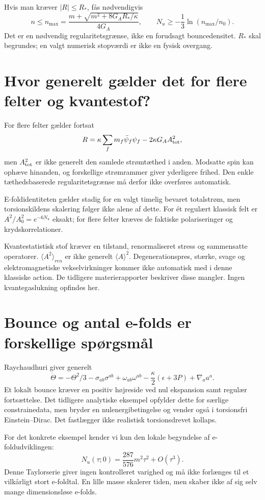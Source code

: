 \documentclass[11pt,a4paper]{article}
\begin{document}
Hvis man kræver $|R|\leq R_*$, fås nødvendigvis
\[
 n\leq n_{\max}=\frac{m+\sqrt{m^2+8G_A R_*/\kappa}}{4G_A},\qquad
 N_u\geq-\frac13\ln(n_{\max}/n_0).
\]
Det er en nødvendig regularitetsgrænse, ikke en forudsagt bouncedensitet. $R_*$ skal begrundes; en valgt numerisk stopværdi er ikke en fysisk overgang.

\section{Hvor generelt gælder det for flere felter og kvantestof?}
For flere felter gælder fortsat
\[
 R=\kappa\sum_fm_f\bar\psi_f\psi_f-2\kappa G_A A_{\rm tot}^2,
\]
men $A_{\rm tot}^2$ er ikke generelt den samlede strømtæthed i anden. Modsatte spin kan ophæve hinanden, og forskellige strømrammer giver yderligere frihed. Den enkle tæthedsbaserede regularitetsgrænse må derfor ikke overføres automatisk.

E-foldidentiteten gælder stadig for en valgt timelig bevaret totalstrøm, men torsionskildens skalering følger ikke alene af dette. For ét regulært klassisk felt er $A^2/A_0^2=e^{-6N_u}$ eksakt; for flere felter kræves de faktiske polariseringer og krydskorrelationer.

Kvantestatistisk stof kræver en tilstand, renormaliseret stress og sammensatte operatorer. $\langle A^2\rangle_{ren}$ er ikke generelt $\langle A\rangle^2$. Degenerationspres, stærke, svage og elektromagnetiske vekselvirkninger kommer ikke automatisk med i denne klassiske action. De tidligere materierapporter beskriver disse mangler. Ingen kvantegaslukning opfindes her.

\section{Bounce og antal e-folds er forskellige spørgsmål}
Raychaudhuri giver generelt
\[
 \dot\Theta=-\Theta^2/3-\sigma_{ab}\sigma^{ab}+\omega_{ab}\omega^{ab}
 -\frac\kappa2(\epsilon+3P)+\nabla_a a^a.
\]
Et lokalt bounce kræver en positiv højreside ved nul ekspansion samt regulær fortsættelse. Det tidligere analytiske eksempel opfylder dette for særlige constrainedata, men bryder en nulenergibetingelse og vender også i torsionsfri Einstein--Dirac. Det fastlægger ikke realistisk torsionsdrevet kollaps.

For det konkrete eksempel kender vi kun den lokale begyndelse af e-foldudviklingen:
\[
 N_u(\tau;0)=\frac{287}{576}m^2\tau^2+O(\tau^3).
\]
Denne Taylorserie giver ingen kontrolleret varighed og må ikke forlænges til et vilkårligt stort e-foldtal. En lille masse skalerer tiden, men skaber ikke af sig selv mange dimensionsløse e-folds.
\end{document}
